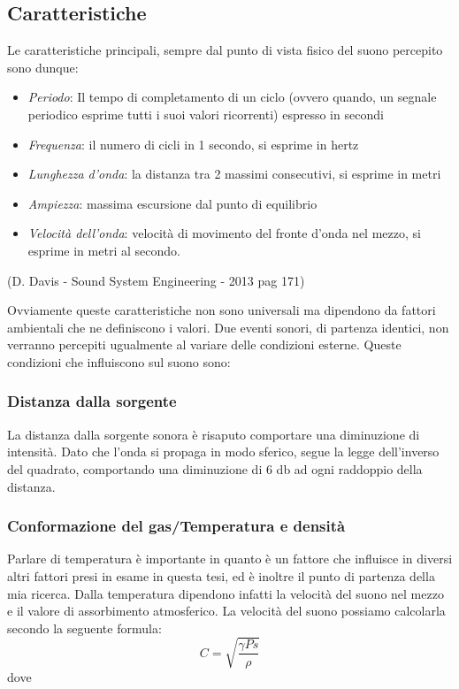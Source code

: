 \subsection{Caratteristiche}
Le caratteristiche principali, sempre dal punto di vista fisico del suono percepito sono dunque:
\begin{itemize}
      \item \emph{Periodo}: 
      Il tempo di completamento di un ciclo (ovvero quando, un segnale periodico esprime tutti i suoi valori ricorrenti) espresso in secondi
      \item \emph{Frequenza}:
      il numero di cicli in 1 secondo, si esprime in hertz
      \item \emph{Lunghezza d'onda}:
      la distanza tra 2 massimi consecutivi, si esprime in metri
      \item \emph{Ampiezza}: 
      massima escursione dal punto di equilibrio
      \item \emph{Velocità dell'onda}: 
      velocità di movimento del fronte d'onda nel mezzo, si esprime in metri al secondo.
\end{itemize}
(D. Davis - Sound System Engineering - 2013 pag 171)
\bigskip

Ovviamente queste caratteristiche non sono universali ma dipendono da fattori ambientali che ne definiscono i valori. Due eventi sonori, di partenza identici, non verranno percepiti ugualmente al variare delle condizioni esterne.
Queste condizioni che influiscono sul suono sono:

\subsubsection{Distanza dalla sorgente}

La distanza dalla sorgente sonora è risaputo comportare una diminuzione di intensità. Dato che l’onda si propaga in modo sferico, segue la legge dell’inverso del quadrato, comportando una diminuzione di 6 db ad ogni raddoppio della distanza.

\subsubsection{Conformazione del gas/Temperatura e densità}

Parlare di temperatura è importante in quanto è un fattore che influisce in diversi altri fattori presi in esame in questa tesi, ed è inoltre il punto di partenza della mia ricerca.
Dalla temperatura dipendono infatti la velocità del suono nel mezzo e il valore di assorbimento atmosferico.
La velocità del suono possiamo calcolarla secondo la seguente formula:
\begin{equation}
C=\sqrt{\frac{\gamma Ps}{\rho}}
\end{equation}
dove

